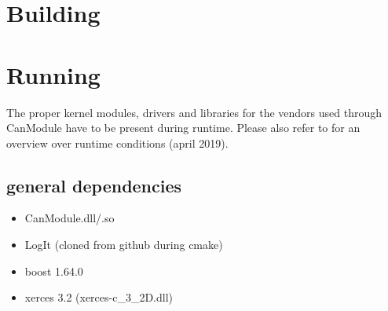 \documentclass[letterpaper,10pt,english]{sphinxmanual}
\begin{document}
\begin{sphinxVerbatim}[commandchars=\\\{\}]
 
  
   
     

\end{sphinxVerbatim}


\chapter{Building}
\label{\detokenize{building:building}}\label{\detokenize{building::doc}}

\chapter{Running}
\label{\detokenize{running:running}}\label{\detokenize{running::doc}}
The proper kernel modules, drivers and libraries for the vendors used through CanModule
have to be present during runtime. Please also refer to  for an overview over
runtime conditions (april 2019).


\section{general dependencies}
\label{\detokenize{running:general-dependencies}}\begin{itemize}
\item {} 
CanModule.dll/.so

\item {} 
LogIt (cloned from github during cmake)

\item {} 
boost 1.64.0

\item {} 
xerces 3.2 (xerces-c\_3\_2D.dll)

\end{itemize}
\end{document}
